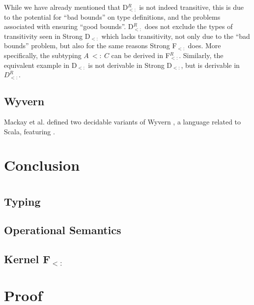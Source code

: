 \documentclass[runningheads]{llncs}
\begin{document}
While we have already mentioned that D$_{<:}^R$ is not indeed transitive, this is due to the potential for ``bad bounds'' on type definitions, and 
the problems associated with ensuring ``good bounds''. D$_{<:}^R$ does not exclude the types of transitivity seen in  Strong D$_{<:}$ which lacks transitivity, 
not only due to the ``bad bounds'' problem, but also for the same reasons Strong F$_{<:}$ does. More specifically, the subtyping $A\ <:\ C$ can be 
derived in F$_{<:}^R$. Similarly, the equivalent example in D$_{<:}$ is not derivable in Strong D$_{<:}$, but is derivable in $D_{<:}^R$.



\subsection{Wyvern}

Mackay et al. \cite{wyvern popl paper} defined two decidable variants of Wyvern \cite{wyvern}, a language related to Scala, featuring .

\section{Conclusion}




\appendix

\section{\Fsub}
\label{app:fsub}

\subsection{Typing}

\subsection{Operational Semantics}

\subsection{Kernel F$_{<:}$}


\section{Proof}
\end{document}
